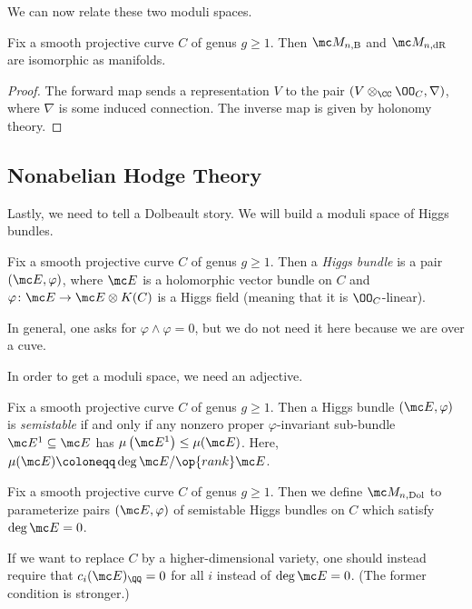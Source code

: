 \documentclass{article}
\begin{document}
We can now relate these two moduli spaces.
\begin{theorem}
	Fix a smooth projective curve $C$ of genus $g\ge1$. Then $\mc M_{n,\mathrm B}$ and $\mc M_{n,\mathrm{dR}}$ are isomorphic as manifolds.
\end{theorem}
\begin{proof}
	The forward map sends a representation $V$ to the pair $(V\otimes_\CC\OO_C,\nabla)$, where $\nabla$ is some induced connection. The inverse map is given by holonomy theory.
\end{proof}

\subsection{Nonabelian Hodge Theory}
Lastly, we need to tell a Dolbeault story. We will build a moduli space of Higgs bundles.
\begin{definition}
	Fix a smooth projective curve $C$ of genus $g\ge1$. Then a \textit{Higgs bundle} is a pair $(\mc E,\varphi)$, where $\mc E$ is a holomorphic vector bundle on $C$ and $\varphi\colon\mc E\to\mc E\otimes K(C)$ is a Higgs field (meaning that it is $\OO_C$-linear).
\end{definition}
\begin{remark}
	In general, one asks for $\varphi\land\varphi=0$, but we do not need it here because we are over a cuve.
\end{remark}
In order to get a moduli space, we need an adjective.
\begin{definition}[semistable]
	Fix a smooth projective curve $C$ of genus $g\ge1$. Then a Higgs bundle $(\mc E,\varphi)$ is \textit{semistable} if and only if any nonzero proper $\varphi$-invariant sub-bundle $\mc E^1\subseteq\mc E$ has $\mu\left(\mc E^1\right)\le\mu(\mc E)$. Here, $\mu(\mc E)\coloneqq\deg\mc E/\op{rank}\mc E$.
\end{definition}
\begin{definition}
	Fix a smooth projective curve $C$ of genus $g\ge1$. Then we define $\mc M_{n,\mathrm{Dol}}$ to parameterize pairs $(\mc E,\varphi)$ of semistable Higgs bundles on $C$ which satisfy $\deg\mc E=0$.
\end{definition}
\begin{remark}
	If we want to replace $C$ by a higher-dimensional variety, one should instead require that $c_i(\mc E)_\QQ=0$ for all $i$ instead of $\deg\mc E=0$. (The former condition is stronger.)
\end{remark}
\end{document}
